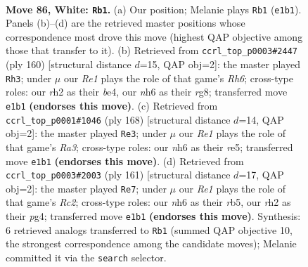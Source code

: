 \documentclass[11pt]{article}
\begin{document}
\clearpage

\begin{figure}[p]\centering
\begin{subfigure}{0.46\textwidth}\centering
\resizebox{\linewidth}{!}{%
\newchessgame
\chessboard[
  setfen={6k1/P7/1P5n/8/8/8/7r/K3R3 w - - 7 86},
  showmover=false,
  pgfstyle=straightmove, color=movearrow, markmove={e1-b1}
]}
\caption{}
\end{subfigure}\hfill
\begin{subfigure}{0.46\textwidth}\centering
\resizebox{\linewidth}{!}{%
\newchessgame
\chessboard[
  setfen={6r1/8/7R/8/4b1k1/8/5P1K/8 w - - 28 81},
  showmover=false,
  pgfstyle=straightmove, color=movearrow, markmove={h6-h3}
]}
\caption{}
\end{subfigure}
\\[4pt]
\begin{subfigure}{0.46\textwidth}\centering
\resizebox{\linewidth}{!}{%
\newchessgame
\chessboard[
  setfen={8/4k3/8/4r3/7p/R4K2/6P1/8 w - - 4 85},
  showmover=false,
  pgfstyle=straightmove, color=movearrow, markmove={a3-e3}
]}
\caption{}
\end{subfigure}\hfill
\begin{subfigure}{0.46\textwidth}\centering
\resizebox{\linewidth}{!}{%
\newchessgame
\chessboard[
  setfen={8/2r5/5k2/1R1K4/5pP1/8/8/8 b - - 2 81},
  showmover=false,
  pgfstyle=straightmove, color=movearrow, markmove={c7-e7}
]}
\caption{}
\end{subfigure}
\caption{\textbf{Move 86, White: \texttt{Rb1}.} (a) Our position; Melanie plays \texttt{Rb1} (\texttt{e1b1}). Panels (b)--(d) are the retrieved master positions whose correspondence most drove this move (highest QAP objective among those that transfer to it). (b) Retrieved from \texttt{ccrl\_top\_p0003\#2447} (ply 160) [structural distance $d$=15, QAP obj=2]: the master played \texttt{Rh3}; under $\mu$ our \emph{Re1} plays the role of that game's \emph{Rh6}; cross-type roles: our \emph{r}h2 as their \emph{b}e4, our \emph{n}h6 as their \emph{r}g8; transferred move \texttt{e1b1} \textbf{(endorses this move)}. (c) Retrieved from \texttt{ccrl\_top\_p0001\#1046} (ply 168) [structural distance $d$=14, QAP obj=2]: the master played \texttt{Re3}; under $\mu$ our \emph{Re1} plays the role of that game's \emph{Ra3}; cross-type roles: our \emph{n}h6 as their \emph{r}e5; transferred move \texttt{e1b1} \textbf{(endorses this move)}. (d) Retrieved from \texttt{ccrl\_top\_p0003\#2003} (ply 161) [structural distance $d$=17, QAP obj=2]: the master played \texttt{Re7}; under $\mu$ our \emph{Re1} plays the role of that game's \emph{Rc2}; cross-type roles: our \emph{n}h6 as their \emph{r}b5, our \emph{r}h2 as their \emph{p}g4; transferred move \texttt{e1b1} \textbf{(endorses this move)}. Synthesis: 6 retrieved analogs transferred to \texttt{Rb1} (summed QAP objective 10, the strongest correspondence among the candidate moves); Melanie committed it via the \texttt{search} selector.}
\label{fig:thought-m170}
\end{figure}
\end{document}
